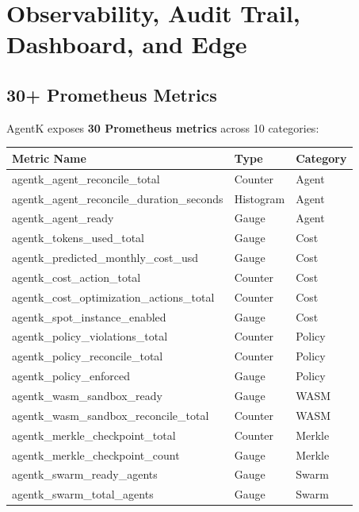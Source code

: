 \documentclass[12pt,a4paper,openany]{report}
\begin{document}
\chapter{Observability, Audit Trail, Dashboard, and Edge}

\section{30+ Prometheus Metrics}

AgentK exposes \textbf{30 Prometheus metrics} across 10 categories:

\begin{longtable}{p{6.5cm}p{3cm}p{3.5cm}}
\toprule
\textbf{Metric Name} & \textbf{Type} & \textbf{Category} \\
\midrule
\endhead
agentk\_agent\_reconcile\_total & Counter & Agent \\
agentk\_agent\_reconcile\_duration\_seconds & Histogram & Agent \\
agentk\_agent\_ready & Gauge & Agent \\
\midrule
agentk\_tokens\_used\_total & Gauge & Cost \\
agentk\_predicted\_monthly\_cost\_usd & Gauge & Cost \\
agentk\_cost\_action\_total & Counter & Cost \\
agentk\_cost\_optimization\_actions\_total & Counter & Cost \\
agentk\_spot\_instance\_enabled & Gauge & Cost \\
\midrule
agentk\_policy\_violations\_total & Counter & Policy \\
agentk\_policy\_reconcile\_total & Counter & Policy \\
agentk\_policy\_enforced & Gauge & Policy \\
\midrule
agentk\_wasm\_sandbox\_ready & Gauge & WASM \\
agentk\_wasm\_sandbox\_reconcile\_total & Counter & WASM \\
\midrule
agentk\_merkle\_checkpoint\_total & Counter & Merkle \\
agentk\_merkle\_checkpoint\_count & Gauge & Merkle \\
\midrule
agentk\_swarm\_ready\_agents & Gauge & Swarm \\
agentk\_swarm\_total\_agents & Gauge & Swarm \\

\end{longtable}
\end{document}
